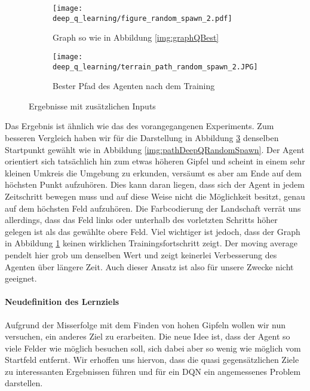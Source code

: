 \begin{figure}[h!]
    \centering
    \begin{subfigure}[b]{0.49\textwidth}
        \texttt{[image: deep\_q\_learning/figure\_random\_spawn\_2.pdf]}
        \caption{Graph so wie in Abbildung \ref{img:graphQBest}}
        \label{img:graphDeepQRandomSpawn2}
    \end{subfigure}
    \begin{subfigure}[b]{0.49\textwidth}
        \texttt{[image: deep\_q\_learning/terrain\_path\_random\_spawn\_2.JPG]}
        \caption{Bester Pfad des Agenten nach dem Training}
        \label{img:pathDeepQRandomSpawn2}
    \end{subfigure}
    \caption{Ergebnisse mit zusätzlichen Inputs}
\end{figure}

Das Ergebnis ist ähnlich wie das des vorangegangenen Experiments. Zum besseren Vergleich haben wir für die Darstellung in Abbildung \ref{img:pathDeepQRandomSpawn2} denselben Startpunkt gewählt wie in Abbildung \ref{img:pathDeepQRandomSpawn}. Der Agent orientiert sich tatsächlich hin zum etwas höheren Gipfel und scheint in einem sehr kleinen Umkreis die Umgebung zu erkunden, versäumt es aber am Ende auf dem höchsten Punkt aufzuhören. Dies kann  daran liegen, dass sich der Agent in jedem Zeitschritt bewegen muss und auf diese Weise nicht die Möglichkeit besitzt, genau auf dem höchsten Feld aufzuhören. Die Farbcodierung der Landschaft verrät uns allerdings, dass das Feld links oder unterhalb des vorletzten Schritts höher gelegen ist als das gewählte obere Feld. Viel wichtiger ist jedoch, dass der Graph in Abbildung \ref{img:graphDeepQRandomSpawn2} keinen wirklichen Trainingsfortschritt zeigt. Der moving average pendelt hier grob um denselben Wert und zeigt keinerlei Verbesserung des Agenten über längere Zeit. Auch dieser Ansatz ist also für unsere Zwecke nicht geeignet.

\paragraph{Neudefinition des Lernziels}
Aufgrund der Misserfolge mit dem Finden von hohen Gipfeln wollen wir nun versuchen, ein anderes Ziel zu erarbeiten. Die neue Idee ist, dass der Agent so viele Felder wie möglich besuchen soll, sich dabei aber so wenig wie möglich vom Startfeld entfernt. Wir erhoffen uns hiervon, dass die quasi gegensätzlichen Ziele zu interessanten Ergebnissen führen und für ein DQN ein angemessenes Problem darstellen.

